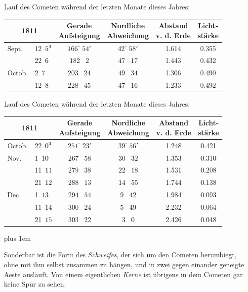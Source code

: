 \begin{center}
Lauf des Cometen während der letzten Monate dieses Jahres:\par
\fontsize{10}{12}\selectfont\setlength{\tabcolsep}{3pt}\renewcommand{\arraystretch}{1.15}\begin{tabular}{ll|c|c|c|c}
\multicolumn{2}{c|}{1811} & \shortstack{Gerade\\Aufsteigung} & \shortstack{Nordliche\\Abweichung} & \shortstack{Abstand\\v. d. Erde} & \shortstack{Licht-\\stärke} \\\hline
Sept. & 12\ $5^{\mathrm u}$ & $166^\circ\;54'$ & $42^\circ\;58'$ & 1.614 & 0.355 \\
 & 22\ $6$ & $182\;\;\;2$ & $47\;\;\;17$ & 1.443 & 0.432 \\
Octob. & 2\ $7$ & $203\;\;\;24$ & $49\;\;\;34$ & 1.306 & 0.490 \\
 & 12\ $8$ & $228\;\;\;45$ & $47\;\;\;16$ & 1.233 & 0.492 \\
\end{tabular}
\end{center}

\begin{center}
Lauf des Cometen während der letzten Monate dieses Jahres:\par
\fontsize{10}{12}\selectfont\setlength{\tabcolsep}{3pt}\renewcommand{\arraystretch}{1.15}\begin{tabular}{ll|c|c|c|c}
\multicolumn{2}{c|}{1811} & \shortstack{Gerade\\Aufsteigung} & \shortstack{Nordliche\\Abweichung} & \shortstack{Abstand\\v. d. Erde} & \shortstack{Licht-\\stärke} \\\hline
Octob. & 22\ $0^{\mathrm u}$ & $251^\circ\;23'$ & $39^\circ\;56'$ & 1.248 & 0.421 \\
Nov. & 1\ $10$ & $267\;\;\;58$ & $30\;\;\;32$ & 1.353 & 0.310 \\
 & 11\ $11$ & $279\;\;\;38$ & $22\;\;\;18$ & 1.531 & 0.208 \\
 & 21\ $12$ & $288\;\;\;13$ & $14\;\;\;55$ & 1.744 & 0.138 \\
Dec. & 1\ $13$ & $294\;\;\;54$ & $9\;\;\;42$ & 1.984 & 0.093 \\
 & 11\ $14$ & $300\;\;\;24$ & $5\;\;\;49$ & 2.232 & 0.064 \\
 & 21\ $15$ & $303\;\;\;22$ & $3\;\;\;0$ & 2.426 & 0.048 \\
\end{tabular}
\end{center}

{\rightskip=0pt plus 1em\par\indent Sonderbar ist die Form des \emph{Schweifes}, der sich um den Cometen herumbiegt, ohne mit ihm selbst zusammen zu hängen, und in zwei gegen einander geneigte Aeste ausläuft. Von einem eigentlichen \emph{Kerne} ist übrigens in dem Cometen gar keine Spur zu sehen.\par}
